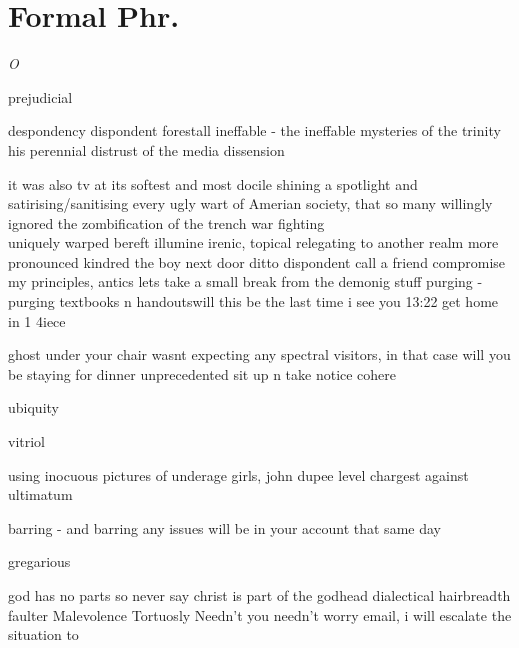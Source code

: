 \section*{Formal Phr.}

\begin{multicols}{2}

\lettrine{\textit{O}}{} \\


\end{multicols}


prejudicial



despondency
dispondent
forestall
ineffable - the ineffable mysteries of the trinity
his perennial distrust of the media
dissension

it was also tv at its softest and most docile
shining a spotlight and satirising/sanitising every ugly wart of Amerian society, that so many willingly ignored
the zombification of the
trench war fighting\\
uniquely warped
bereft illumine irenic, topical relegating to another realm
more pronounced
kindred
the boy next door
ditto
dispondent
call a friend
compromise my principles, antics
lets take a small break from the demonig stuff
purging - purging textbooks n handoutswill this be the last time i see you
13:22
get home in 1 4iece


ghost under your chair
wasnt expecting any spectral visitors, in that case will you be staying for dinner
unprecedented
sit up n take notice
cohere

ubiquity

vitriol

using inocuous pictures of underage girls, john dupee
level chargest against
ultimatum

barring - and barring any issues will be in your account that same day

gregarious

god has no parts so never say christ is part of the godhead
dialectical
hairbreadth
faulter
Malevolence
Tortuosly
Needn't you needn't worry
email, i will escalate the situation to

